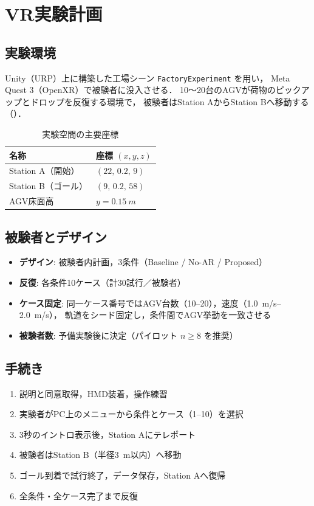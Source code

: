 \section{VR実験計画}
\label{sec:experiment}

\subsection{実験環境}

Unity（URP）上に構築した工場シーン \texttt{FactoryExperiment} を用い，
Meta Quest 3（OpenXR）で被験者に没入させる．
10〜20台のAGVが荷物のピックアップとドロップを反復する環境で，
被験者はStation AからStation Bへ移動する（）．

\begin{table}[htbp]
  \centering
  \caption{実験空間の主要座標}
  \label{tab:layout}
  \begin{tabular}{ll}
    \toprule
    名称 & 座標 $(x, y, z)$ \\
    \midrule
    Station A（開始） & $(22,\, 0.2,\, 9)$ \\
    Station B（ゴール） & $(9,\, 0.2,\, 58)$ \\
    AGV床面高 & $y = \SI{0.15}{m}$ \\
    \bottomrule
  \end{tabular}
\end{table}

\subsection{被験者とデザイン}

\begin{itemize}[leftmargin=2em]
  \item \textbf{デザイン}: 被験者内計画，3条件（Baseline / No-AR / Proposed）
  \item \textbf{反復}: 各条件10ケース（計30試行／被験者）
  \item \textbf{ケース固定}: 同一ケース番号ではAGV台数（10--20），速度（\SIrange{1.0}{2.0}{m/s}），
        軌道をシード固定し，条件間でAGV挙動を一致させる
  \item \textbf{被験者数}: 予備実験後に決定（パイロット $n \ge 8$ を推奨）
\end{itemize}

\subsection{手続き}

\begin{enumerate}[leftmargin=2em]
  \item 説明と同意取得，HMD装着，操作練習
  \item 実験者がPC上のメニューから条件とケース（1--10）を選択
  \item 3秒のイントロ表示後，Station Aにテレポート
  \item 被験者はStation B（半径\SI{3}{m}以内）へ移動
  \item ゴール到着で試行終了，データ保存，Station Aへ復帰
  \item 全条件・全ケース完了まで反復
\end{enumerate}

